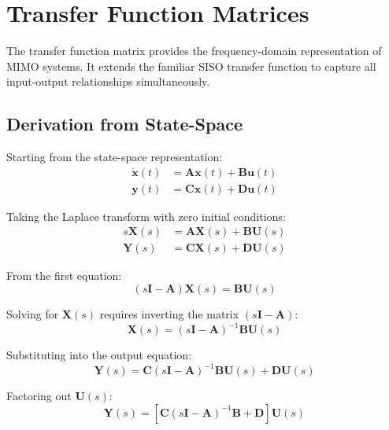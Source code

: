 \section{Transfer Function Matrices}
\label{sec:transfer_function_matrices}

The transfer function matrix provides the frequency-domain representation of MIMO systems. It extends the familiar SISO transfer function to capture all input-output relationships simultaneously.

\subsection{Derivation from State-Space}

Starting from the state-space representation:
\begin{align}
\dot{\mathbf{x}}(t) &= \mathbf{A}\mathbf{x}(t) + \mathbf{B}\mathbf{u}(t) \\
\mathbf{y}(t) &= \mathbf{C}\mathbf{x}(t) + \mathbf{D}\mathbf{u}(t)
\end{align}

Taking the Laplace transform with zero initial conditions:
\begin{align}
s\mathbf{X}(s) &= \mathbf{A}\mathbf{X}(s) + \mathbf{B}\mathbf{U}(s) \\
\mathbf{Y}(s) &= \mathbf{C}\mathbf{X}(s) + \mathbf{D}\mathbf{U}(s)
\end{align}

From the first equation:
\begin{equation}
(s\mathbf{I} - \mathbf{A})\mathbf{X}(s) = \mathbf{B}\mathbf{U}(s)
\end{equation}

Solving for $\mathbf{X}(s)$ requires inverting the matrix $(s\mathbf{I} - \mathbf{A})$:
\begin{equation}
\mathbf{X}(s) = (s\mathbf{I} - \mathbf{A})^{-1}\mathbf{B}\mathbf{U}(s)
\end{equation}

Substituting into the output equation:
\begin{equation}
\mathbf{Y}(s) = \mathbf{C}(s\mathbf{I} - \mathbf{A})^{-1}\mathbf{B}\mathbf{U}(s) + \mathbf{D}\mathbf{U}(s)
\end{equation}

Factoring out $\mathbf{U}(s)$:
\begin{equation}
\mathbf{Y}(s) = \left[\mathbf{C}(s\mathbf{I} - \mathbf{A})^{-1}\mathbf{B} + \mathbf{D}\right]\mathbf{U}(s)
\end{equation}

